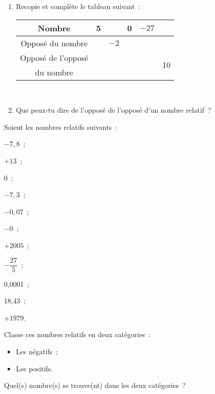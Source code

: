 \begin{exercice}
\begin{enumerate}
 \item Recopie et complète le tableau suivant : \\[0.5em]
{\small
 \begin{tabularx}{\linewidth}{|c|X|c|X|c|c|}
  \hline
 Nombre & 5 & & 0 & $-27$ & \\\hline
 Opposé du nombre & & $-2$ & & & \\\hline
 Opposé de l'opposé & & & & & \multirow{2}{*}{10} \\
du nombre & & & & & \\\hline
  \end{tabularx} \\[0.5em]
  } %
 \item Que peux-tu dire de l'opposé de l'opposé d'un nombre relatif ?
 \end{enumerate}
\end{exercice}


\begin{exercice}[Classement]
Soient les nombres relatifs suivants :
\begin{colitemize}{3}
 \item $- 7,8$ ;
 \item $+ 13$ ;
 \item 0 ;
 \item $- 7,3$ ;
 \item $- 0,07$ ;
 \item $- 0$ ;
 \item $+ 2005$ ;
 \item $- \dfrac{27}{5}$ ;
 \item 0,0001 ;
 \item 18,43 ;
 \item $+ 1979$.
 \end{colitemize}
 
Classe ces nombres relatifs en deux catégories :
\begin{itemize}
 \item Les négatifs ;
 \item Les positifs.
 \end{itemize}
Quel(s) nombre(s) se trouve(nt) dans les deux catégories ?
\end{exercice}


